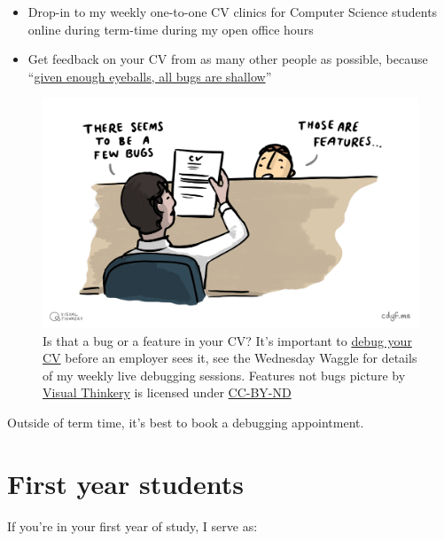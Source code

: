 \documentclass[
  12pt,
]{book}
\providecommand{\tightlist}{%
  \setlength{\itemsep}{0pt}\setlength{\parskip}{0pt}}
\begin{document}
\begin{itemize}
\tightlist
\item
  Drop-in to my weekly one-to-one CV clinics for Computer Science students online during term-time during my open office hours
\item
  Get feedback on your CV from as many other people as possible, because ``\href{https://en.wikipedia.org/wiki/Linus\%27s_law}{given enough eyeballs, all bugs are shallow}'' \citep{Raymond1999}
\end{itemize}

\begin{figure}

{\centering \includegraphics[width=1\linewidth]{images/Features not bugs} 

}

\caption{Is that a bug or a feature in your CV? It's important to \href{https://www.cdyf.me/debugging.html}{debug your CV} before an employer sees it, see the Wednesday Waggle for details of my weekly live debugging sessions. Features not bugs picture by \href{https://visualthinkery.com}{Visual Thinkery} is licensed under \href{https://creativecommons.org/licenses/by-nd/4.0/}{CC-BY-ND}}\label{fig:bugfeature-fig}
\end{figure}



Outside of term time, it's best to book a debugging appointment. 🐛

\hypertarget{year1}{%
\section{First year students}\label{year1}}

If you're in your first year of study, I serve as:
\end{document}
